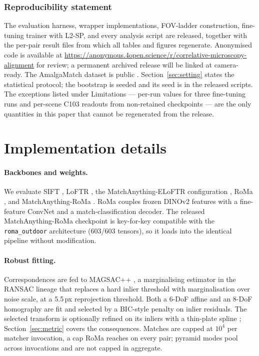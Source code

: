 \documentclass[10pt]{article}
\begin{document}
\subsubsection*{Reproducibility statement}

The evaluation harness, wrapper implementations, FOV-ladder construction, fine-tuning trainer with L2-SP, and every analysis script are released, together with the per-pair result files from which all tables and figures regenerate. Anonymised code is available at \url{https://anonymous.4open.science/r/correlative-microscopy-alignment} for review; a permanent archived release will be linked at camera-ready. The AmalgaMatch dataset is public \citep{durmaz2026amalgamatch}. Section~\ref{sec:setting} states the statistical protocol; the bootstrap is seeded and its seed is in the released scripts. The exceptions listed under Limitations --- per-run values for three fine-tuning runs and per-scene C103 readouts from non-retained checkpoints --- are the only quantities in this paper that cannot be regenerated from the release.




\appendix

\section{Implementation details}
\label{app:impl}

\paragraph{Backbones and weights.} We evaluate SIFT \citep{lowe2004sift}, LoFTR \citep{sun2021loftr}, the MatchAnything-ELoFTR configuration \citep{wang2024efficientloftr,he2025matchanything}, RoMa \citep{edstedt2024roma}, and MatchAnything-RoMa \citep{he2025matchanything}. RoMa couples frozen DINOv2 features \citep{oquab2024dinov2} with a fine-feature ConvNet and a match-classification decoder. The released MatchAnything-RoMa checkpoint is key-for-key compatible with the \texttt{roma\_outdoor} architecture (603/603 tensors), so it loads into the identical pipeline without modification.

\paragraph{Robust fitting.} Correspondences are fed to MAGSAC++ \citep{barath2020magsac}, a marginalising estimator in the RANSAC lineage \citep{fischler1981ransac} that replaces a hard inlier threshold with marginalisation over noise scale, at a 5.5\,px reprojection threshold. Both a 6-DoF affine and an 8-DoF homography are fit and selected by a BIC-style penalty on inlier residuals. The selected transform is optionally refined on its inliers with a thin-plate spline \citep{bookstein1989tps}; Section~\ref{sec:metric} covers the consequences. Matches are capped at $10^4$ per matcher invocation, a cap RoMa reaches on every pair; pyramid modes pool across invocations and are not capped in aggregate.
\end{document}
